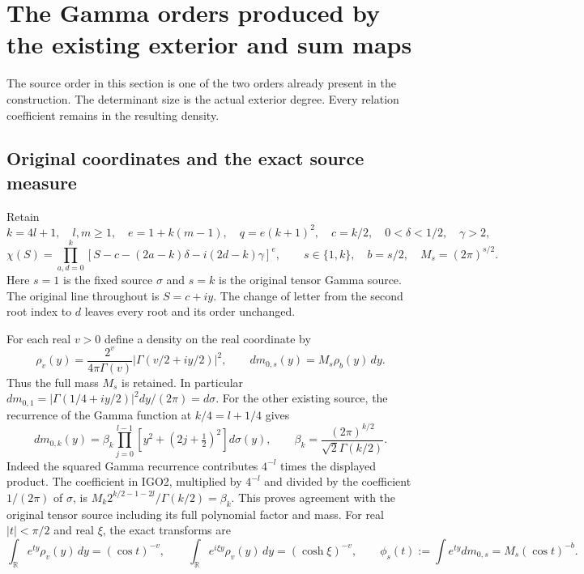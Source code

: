 \section{The Gamma orders produced by the existing exterior and sum maps}
\label{sec:IGO}

The source order in this section is one of the two orders already present
in the construction. The determinant size is the actual exterior degree.
Every relation coefficient remains in the resulting density.

\subsection{Original coordinates and the exact source measure}
Retain
\[
 k=4l+1,\quad l,m\geq1,\quad e=1+k(m-1),\quad
 q=e(k+1)^2,\quad c=k/2,\quad
 0<\delta<1/2,\quad\gamma>2,
\]
\[
 \chi(S)=\prod_{a,d=0}^{k}
 [S-c-(2a-k)\delta-i(2d-k)\gamma]^e,
 \qquad s\in\{1,k\},\quad b=s/2,\quad M_s=(2\pi)^{s/2}.
 \tag{IGO1}
\]
Here $s=1$ is the fixed source $\sigma$ and $s=k$ is the original
tensor Gamma source. The original line throughout is $S=c+iy$.
The change of letter from the second root index to $d$ leaves every
root and its order unchanged.

For each real $v>0$ define a density on the real coordinate by
\[
 \rho_v(y)=\frac{2^v}{4\pi\Gamma(v)}
       \left|\Gamma(v/2+iy/2)\right|^2,
 \qquad dm_{0,s}(y)=M_s\rho_b(y)\,dy.
 \tag{IGO2}
\]
Thus the full mass $M_s$ is retained. In particular
$dm_{0,1}=|\Gamma(1/4+iy/2)|^2dy/(2\pi)=d\sigma$.
For the other existing source, the recurrence of the Gamma function
at $k/4=l+1/4$ gives
\[
 dm_{0,k}(y)=\beta_k\prod_{j=0}^{l-1}
           [y^2+(2j+\tfrac12)^2]d\sigma(y),\qquad
 \beta_k=\frac{(2\pi)^{k/2}}{\sqrt2\Gamma(k/2)}.
\]
Indeed the squared Gamma recurrence contributes $4^{-l}$ times
the displayed product. The coefficient in IGO2, multiplied by
$4^{-l}$ and divided by the coefficient $1/(2\pi)$ of $\sigma$,
is $M_k2^{k/2-1-2l}/\Gamma(k/2)=\beta_k$.
This proves agreement with the original tensor source including
its full polynomial factor and mass.
For real $|t|<\pi/2$ and real $\xi$, the exact transforms are
\[
 \int_{\mathbb R}e^{ty}\rho_v(y)\,dy=(\cos t)^{-v},\qquad
 \int_{\mathbb R}e^{i\xi y}\rho_v(y)\,dy=(\cosh\xi)^{-v},
 \qquad \phi_s(t):=\int e^{ty}dm_{0,s}=M_s(\cos t)^{-b}.
 \tag{IGO3}
\]

